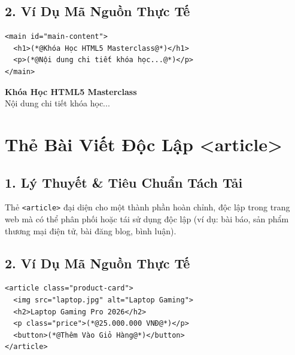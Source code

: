 \documentclass[11pt,oneside]{book}
\newcommand{\codeinline}[1]{\textcolor{accentOrange}{\texttt{#1}}}
\begin{document}
\subsection{2. Ví Dụ Mã Nguồn Thực Tế}
\begin{codeWindow}
\begin{lstlisting}[language=HTML5]
<main id="main-content">
  <h1>(*@Khóa Học HTML5 Masterclass@*)</h1>
  <p>(*@Nội dung chi tiết khóa học...@*)</p>
</main>
\end{lstlisting}
\end{codeWindow}

\begin{browserWindow}
\sffamily
{\Large\bfseries Khóa Học HTML5 Masterclass}\\[3pt]
{\small Nội dung chi tiết khóa học...}
\end{browserWindow}

\section{Thẻ Bài Viết Độc Lập <article>}
\subsection{1. Lý Thuyết \& Tiêu Chuẩn Tách Tải}
Thẻ \codeinline{<article>} đại diện cho một thành phần hoàn chỉnh, độc lập trong trang web mà có thể phân phối hoặc tái sử dụng độc lập (ví dụ: bài báo, sản phẩm thương mại điện tử, bài đăng blog, bình luận).

\subsection{2. Ví Dụ Mã Nguồn Thực Tế}
\begin{codeWindow}
\begin{lstlisting}[language=HTML5]
<article class="product-card">
  <img src="laptop.jpg" alt="Laptop Gaming">
  <h2>Laptop Gaming Pro 2026</h2>
  <p class="price">(*@25.000.000 VNĐ@*)</p>
  <button>(*@Thêm Vào Giỏ Hàng@*)</button>
</article>
\end{lstlisting}
\end{codeWindow}
\end{document}
